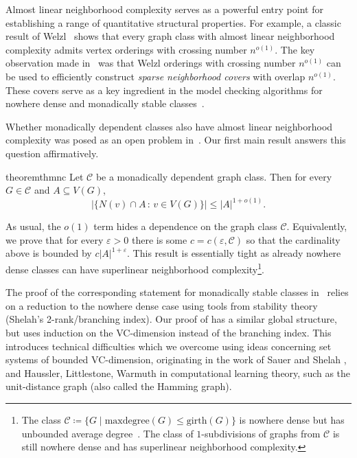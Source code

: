 \documentclass[11pt]{article}
\theoremstyle{definition}
\newcommand{\CC}{{\mathscr C}}
\renewcommand{\leq}{\leqslant}
\newcommand{\set}[1]{\{#1\}}
\let\epsilon\varepsilon
\begin{document}
Almost linear neighborhood complexity serves as a powerful entry point for establishing a range of quantitative structural properties.
For example, a classic result of Welzl~\cite{Welzl88} shows that every graph class with almost linear neighborhood complexity admits vertex orderings with crossing number \(n^{o(1)}\).
The key observation made in~\cite{stable_MC} was that Welzl orderings with crossing number \(n^{o(1)}\) can be used to efficiently construct \emph{sparse neighborhood covers} with overlap \(n^{o(1)}\). 
These covers serve as a key ingredient in the model checking algorithms for nowhere dense and monadically stable classes~\cite{grohe2017deciding,ssmc,stable_MC}.


Whether monadically dependent classes also have almost linear neighborhood complexity was posed as an open problem in~\cite{stable_MC}.
Our first main result answers this question affirmatively.

\begin{restatable}{theorem}{thmnc}\label{thm:nei-comp-NIP}
Let $\CC$ be a monadically dependent graph class. Then for every $G\in \CC$ and $A\subseteq V(G)$,
\[\Big|\set{N(v)\cap A\,:\, v\in V(G)}\Big| \leq |A|^{1+o(1)}.\]
\end{restatable}
\noindent As usual, the $o(1)$ term hides a dependence on the graph class $\CC$. 
Equivalently, we prove that for every $\epsilon>0$ there is some $c=c(\epsilon, \CC)$ so that the cardinality above is bounded by $c|A|^{1+\epsilon}$.
This result is essentially tight as already nowhere dense classes can have superlinear neighborhood complexity\footnote{The class $\CC \coloneqq \{G \mid \mathrm{maxdegree}(G) \leq \mathrm{girth}(G)\}$ is nowhere dense but has unbounded average degree~\cite[Lem.\ 8]{pilipczuk2017sparsity-lecture1}. The class of $1$-subdivisions of graphs from $\CC$ is still nowhere dense and has superlinear neighborhood complexity.}.

The proof of the corresponding statement for monadically stable classes in~\cite{stable_MC} relies on a reduction to the nowhere dense case using tools from stability theory (Shelah's 2-rank/branching index). 
Our proof of  has a similar global structure, but uses induction on the VC-dimension instead of the branching index. This introduces technical difficulties which we overcome using ideas concerning set systems of bounded VC-dimension, originating in the work of Sauer and Shelah \cite{sauer1972sauershelah,shelah1972sauershelah}, and Haussler, Littlestone, Warmuth \cite{Haussler1994,Haussler95} in computational learning theory, such as the unit-distance graph (also called the Hamming graph).
\end{document}

